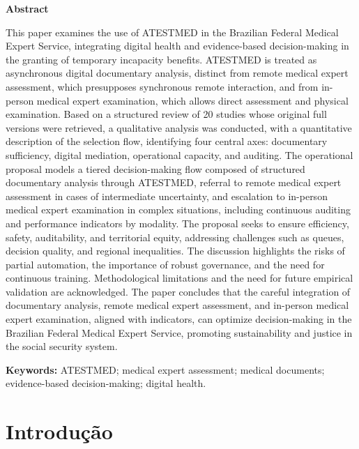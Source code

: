 \documentclass[12pt,a4paper]{article}
\begin{document}
\vspace{0.8em}
\begin{center}
\textbf{Abstract}
\end{center}
This paper examines the use of ATESTMED in the Brazilian Federal Medical Expert Service, integrating digital health and evidence-based decision-making in the granting of temporary incapacity benefits. ATESTMED is treated as asynchronous digital documentary analysis, distinct from remote medical expert assessment, which presupposes synchronous remote interaction, and from in-person medical expert examination, which allows direct assessment and physical examination. Based on a structured review of 20 studies whose original full versions were retrieved, a qualitative analysis was conducted, with a quantitative description of the selection flow, identifying four central axes: documentary sufficiency, digital mediation, operational capacity, and auditing. The operational proposal models a tiered decision-making flow composed of structured documentary analysis through ATESTMED, referral to remote medical expert assessment in cases of intermediate uncertainty, and escalation to in-person medical expert examination in complex situations, including continuous auditing and performance indicators by modality. The proposal seeks to ensure efficiency, safety, auditability, and territorial equity, addressing challenges such as queues, decision quality, and regional inequalities. The discussion highlights the risks of partial automation, the importance of robust governance, and the need for continuous training. Methodological limitations and the need for future empirical validation are acknowledged. The paper concludes that the careful integration of documentary analysis, remote medical expert assessment, and in-person medical expert examination, aligned with indicators, can optimize decision-making in the Brazilian Federal Medical Expert Service, promoting sustainability and justice in the social security system.

\noindent\textbf{Keywords:} ATESTMED; medical expert assessment; medical documents; evidence-based decision-making; digital health.
\endgroup


\section{Introdução}
\label{sec:orgbd5aae4}
\end{document}
